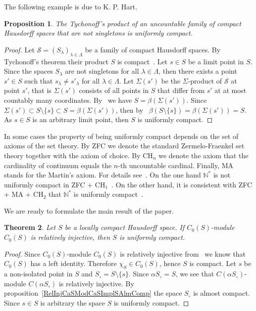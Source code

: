 \documentclass[12pt]{article}
\newtheorem{theorem}{Theorem}[section]
\newtheorem{proposition}[theorem]{Proposition}
\begin{document}
The following example is due to K. P. Hart.

\begin{proposition}\label{UcountProdCompSpIsUnifComp} The Tychonoff's product of
    an uncountable family of compact Hausdorff spaces that are not singletons is
    uniformly compact.
\end{proposition}
\begin{proof} Let $\mathcal{S}={(S_\lambda)}_{\lambda\in\Lambda}$ be a family of
    compact Hausdorff spaces. By Tychonoff's theorem their product $S$ is
    compact~\cite[theorem 3.2.4]{EngkingGenTop}. Let $s\in S$ be a limit point
    in $S$. Since the spaces $S_\lambda$ are not singletons for all
    $\lambda\in\Lambda$, then there exists a point $s'\in S$ such that
    $s_\lambda\neq s'_\lambda$ for all $\lambda\in\Lambda$. Let $\Sigma(s')$ be
    the $\Sigma$-product of $\mathcal{S}$ at point $s'$, that is $\Sigma(s')$
    consists of all points in $S$ that differ from $s'$ at at most countably
    many coordinates. By~\cite[exercise 3.12.24(c)]{EngkingGenTop} we have
    $S=\beta(\Sigma(s'))$. Since $\Sigma(s')\subset S\setminus \{s\}\subset
        S=\beta(\Sigma(s'))$, then by~\cite[corollary 3.6.9]{EngkingGenTop}
    $\beta(S\setminus \{s\})=\beta(\Sigma(s'))=S$. As $s\in S$ is an arbitrary
    limit point, then $S$ is uniformly compact.
\end{proof}

In some cases the property of being uniformly compact depends on the set of
axioms of the set theory. By \textsc{ZFC} we denote the standard
Zermelo-Fraenkel set theory together with the axiom of choice. By
\textsc{CH}$_n$ we denote the axiom that the cardinality of continuum equals the
$n$-th uncountable cardinal. Finally, \textsc{MA} stands for the Martin's axiom.
For details see~\cite{KunSetThIndepPrf}. On the one hand $\mathbb{N}^*$ is not
uniformly compact in \textsc{ZFC + CH$_1$}~\cite{FinGillExtContFuncbN}. On the
other hand, it is consistent with \textsc{ZFC + MA + CH$_2$} that $\mathbb{N}^*$
is uniformly compact~\cite{DouKunMillCStarEmbdDenPropSbspStoneRemN}.

We are ready to formulate the main result of the paper.

\begin{theorem}\label{RelInjCSModCSImplUnifCompS} Let $S$ be a locally compact
    Hausdorff space. If $C_0(S)$-module $C_0(S)$ is relatively injective, then
    $S$ is uniformly compact.
\end{theorem}
\begin{proof} Since $C_0(S)$-module $C_0(S)$ is relatively injective
    from~\cite[corollary 2.2.8 (i)]{RamsHomPropSemgroupAlg} we know that
    $C_0(S)$ has a left identity. Therefore $\chi_S\in C_0(S)$, hence $S$ is
    compact. Let $s$ be a non-isolated point in $S$ and $S_\circ=S\setminus
        \{s\}$. Since $\alpha S_\circ=S$, we see that $C(\alpha S_\circ)$-module
    $C(\alpha S_\circ)$ is relatively injective. By
    proposition~\ref{RelInjCaSModCaSImplSAlmComp} the space $S_\circ$ is almost
    compact. Since $s\in S$ is arbitrary the space $S$ is uniformly compact.
\end{proof}
\end{document}
